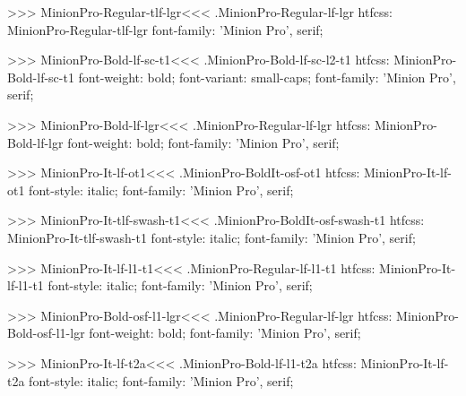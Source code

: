{>>>
\<MinionPro-Regular-tlf-lgr\><<<
.MinionPro-Regular-lf-lgr
htfcss:  MinionPro-Regular-tlf-lgr  font-family: 'Minion Pro', serif;

>>>
\<MinionPro-Bold-lf-sc-t1\><<<
.MinionPro-Bold-lf-sc-l2-t1
htfcss:  MinionPro-Bold-lf-sc-t1  font-weight: bold; font-variant: small-caps; font-family: 'Minion Pro', serif;

>>>
\<MinionPro-Bold-lf-lgr\><<<
.MinionPro-Regular-lf-lgr
htfcss:  MinionPro-Bold-lf-lgr  font-weight: bold; font-family: 'Minion Pro', serif;

>>>
\<MinionPro-It-lf-ot1\><<<
.MinionPro-BoldIt-osf-ot1
htfcss:  MinionPro-It-lf-ot1  font-style: italic; font-family: 'Minion Pro', serif;

>>>
\<MinionPro-It-tlf-swash-t1\><<<
.MinionPro-BoldIt-osf-swash-t1
htfcss:  MinionPro-It-tlf-swash-t1  font-style: italic; font-family: 'Minion Pro', serif;

>>>
\<MinionPro-It-lf-l1-t1\><<<
.MinionPro-Regular-lf-l1-t1
htfcss:  MinionPro-It-lf-l1-t1  font-style: italic; font-family: 'Minion Pro', serif;

>>>
\<MinionPro-Bold-osf-l1-lgr\><<<
.MinionPro-Regular-lf-lgr
htfcss:  MinionPro-Bold-osf-l1-lgr  font-weight: bold; font-family: 'Minion Pro', serif;

>>>
\<MinionPro-It-lf-t2a\><<<
.MinionPro-Bold-lf-l1-t2a
htfcss:  MinionPro-It-lf-t2a  font-style: italic; font-family: 'Minion Pro', serif;

}

